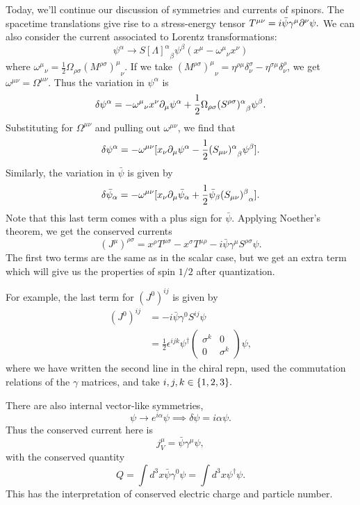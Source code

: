 Today, we'll continue our discussion of symmetries and currents of spinors. The spacetime translations give rise to a stress-energy tensor $T^{\mu\nu}=i \bar \psi \gamma^\mu \partial^\nu \psi.$ We can also consider the current associated to Lorentz transformations:
$$\psi^\alpha \to {S[\Lambda]^\alpha}_\beta\psi^\beta (x^\mu-{\omega^\mu}_\nu x^\nu)$$
where ${\omega^\mu}_\nu=\frac{1}{2}\Omega_{\rho\sigma}{(M^{\rho\sigma})^\mu}_\nu.$ If we take ${(M^{\rho\sigma})^\mu}_\nu = \eta^{\rho\mu}\delta^\sigma_\nu -\eta^{\sigma\mu} \delta^\rho_\nu$, we get $\omega^{\mu\nu}=\Omega^{\mu\nu}.$ Thus the variation in $\psi^\alpha$ is
$$\delta \psi^\alpha = -{\omega^\mu}_\nu x^\nu \partial_\mu \psi^\alpha +\frac{1}{2}\Omega_{\rho\sigma} {(S^{\rho\sigma})^\alpha}_\beta \psi^\beta.$$
Substituting for $\Omega^{\mu\nu}$ and pulling out $\omega^{\mu\nu}$, we find that
$$\delta \psi^\alpha = -\omega^{\mu\nu}[x_\nu \partial_\mu \psi^\alpha -\frac{1}{2} {(S_{\mu\nu})^\alpha}_\beta \psi^\beta].$$
Similarly, the variation in $\bar \psi$ is given by
$$\delta \bar\psi_\alpha = -\omega^{\mu\nu}[x_\nu \partial_\mu \bar \psi_\alpha +\frac{1}{2} \bar \psi_\beta {(S_{\mu\nu})^\beta}_\alpha].$$
Note that this last term comes with a plus sign for $\bar\psi$. Applying Noether's theorem, we get the conserved currents
$$(J^\mu)^{\rho\sigma}=x^\rho T^{\mu\sigma}-x^\sigma T^{\mu\rho}-i \bar \psi \gamma^\mu S^{\rho\sigma}\psi.$$
The first two terms are the same as in the scalar case, but we get an extra term which will give us the properties of spin $1/2$ after quantization.

For example, the last term for $(J^0)^{ij}$ is given by
\begin{align*}
    (J^0)^{ij}&= -i\bar \psi \gamma^0 S^{ij}\psi\\
    &= \frac{1}{2}\epsilon^{ijk}\psi^\dagger \begin{pmatrix}\sigma^k & 0\\0&\sigma^k\end{pmatrix}\psi,
\end{align*}
where we have written the second line in the chiral repn, used the commutation relations of the $\gamma$ matrices, and take $i,j,k\in \{1,2,3\}.$

There are also internal vector-like symmetries,
$$\psi\to e^{i\alpha}\psi \implies \delta \psi =i\alpha \psi.$$
Thus the conserved current here is
$$j^\mu_V = \bar \psi \gamma^\mu \psi,$$
with the conserved quantity
$$Q=\int d^3x \bar \psi \gamma^0 \psi =\int d^3x \psi^\dagger \psi.$$
This has the interpretation of conserved electric charge and particle number.

